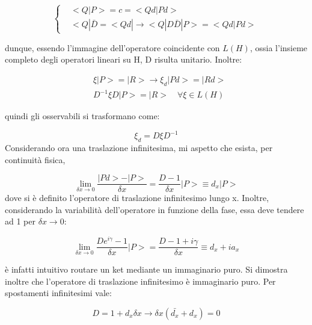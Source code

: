 \documentclass{article}
\begin{document}
\begin{equation}
    \left\{
    \begin{aligned}
         & <Q |P>=c=<Qd|Pd>                                       \\
         & <Q |\bar{D}= <Qd| \rightarrow <Q |D \bar{D}|P>=<Qd|Pd>
    \end{aligned}
    \right.
\end{equation}

dunque, essendo l'immagine dell'operatore coincidente con $L(H)$, ossia l'insieme completo degli operatori
lineari su H, D risulta unitario.
Inoltre:

\begin{equation}
    \begin{aligned}
         & \xi |P>=|R> \rightarrow \xi_d |Pd>= |Rd>         \\
         & D^{-1}\xi D |P>= |R> \quad \forall  \xi \in L(H)
    \end{aligned}
\end{equation}

quindi gli osservabili si trasformano come:

\begin{equation}
    \xi_d = D \xi D^{-1}
\end{equation}
Considerando ora una traslazione infinitesima, mi aspetto che esista, per continuità fisica,

\begin{equation}
    \lim_{\delta x \rightarrow 0} \frac{|Pd>-|P>}{\delta x}= \frac{D-1}{\delta x}|P>\equiv d_x |P>
\end{equation}
dove si è definito l'operatore di traslazione infinitesimo lungo x.
Inoltre, considerando la variabilità dell'operatore in funzione della fase, essa deve tendere ad 1 per $\delta x \rightarrow 0$:

\begin{equation}
    \lim_{\delta x \rightarrow 0} \frac{De^{i\gamma}-1}{\delta x}|P>= \frac{D-1+i\gamma}{\delta x}\equiv d_x+ia_x
\end{equation}

è infatti intuitivo routare un ket mediante un immaginario puro.
Si dimostra inoltre che l'operatore di traslazione infinitesimo è immaginario puro.
Per spostamenti infinitesimi vale:

\begin{equation}
    D= 1+d_x\delta x \rightarrow \delta x (\bar{d_x}+d_x)=0
\end{equation}
\end{document}

